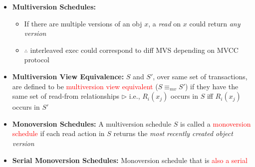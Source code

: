\documentclass[10pt,landscape]{article}
\newcommand{\1}{\mathmybb{1}}
\begin{document}
\begin{multicols*}{3}
\begin{itemize}
    \item \textbf{Multiversion Schedules:}
        \begin{itemize} 
            \item If there are multiple versions of an obj $x$, a \textit{read} on $x$ could return \textit{any version}
            \item $\therefore$ interleaved exec could correspond to diff MVS depending on MVCC protocol
        \end{itemize}
    \item \textbf{Multiversion View Equivalence:} $S$ and $S'$, over same set of transactions, are defined to be \textcolor{red}{multiversion view equivalent} ($S \equiv_{mv} S'$) if they have the same set of read-from relationships $\triangleright$ i.e., $R_i(x_j)$ occurs in $S$ iff $R_i(x_j)$ occurs in $S'$
    \item \textbf{Monoversion Schedules:} A multiversion schedule $S$ is called a \textcolor{red}{monoversion schedule} if each read action in $S$ returns the \textit{most recently created object version}
    \item \textbf{Serial Monoversion Schedules:} Monoversion schedule that is \textcolor{red}{also a serial}
\end{itemize} 


\end{multicols*}
\end{document}

